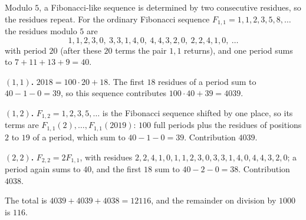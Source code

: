 Modulo $5$, a Fibonacci-like sequence is determined by two consecutive residues, so the residues repeat. For the ordinary Fibonacci sequence $F_{1,1}=1,1,2,3,5,8,\dots$ the residues modulo $5$ are
\[
1,1,2,3,0,\ 3,3,1,4,0,\ 4,4,3,2,0,\ 2,2,4,1,0,\ \ldots
\]
with period $20$ (after these $20$ terms the pair $1,1$ returns), and one period sums to $7+11+13+9=40$.

\textbf{$(1,1)$.} $2018=100\cdot20+18$. The first $18$ residues of a period sum to $40-1-0=39$, so this sequence contributes $100\cdot40+39=4039$.

\textbf{$(1,2)$.} $F_{1,2}=1,2,3,5,\dots$ is the Fibonacci sequence shifted by one place, so its terms are $F_{1,1}(2),\dots,F_{1,1}(2019)$: $100$ full periods plus the residues of positions $2$ to $19$ of a period, which sum to $40-1-0=39$. Contribution $4039$.

\textbf{$(2,2)$.} $F_{2,2}=2F_{1,1}$, with residues $2,2,4,1,0,1,1,2,3,0,3,3,1,4,0,4,4,3,2,0$; a period again sums to $40$, and the first $18$ sum to $40-2-0=38$. Contribution $4038$.

The total is $4039+4039+4038=12116$, and the remainder on division by $1000$ is $\boxed{116}$.
